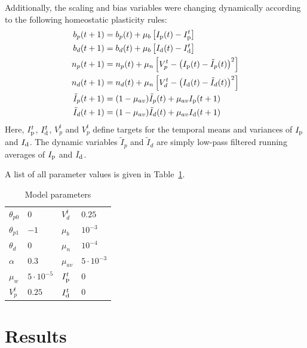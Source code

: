 \documentclass[10pt,a4paper,twocolumn]{article}
\begin{document}
		Additionally, the scaling and bias variables were changing dynamically
		according to the following homeostatic plasticity rules:
		\begin{align}
			b_p(t+1) &= b_p(t) + \mu_b \left[I_{\rm p}(t) - I_{\rm p}^t\right] \\
			b_d(t+1) &= b_d(t) + \mu_b \left[I_{\rm d}(t) - I_{\rm d}^t\right] \\
			n_p(t+1) &= n_p(t) + \mu_n \left[V_p^t - \left( I_{\rm p}(t) - \tilde{I}_p(t)\right)^2\right] \\
			n_d(t+1) &= n_d(t) + \mu_n \left[V_d^t - \left( I_{\rm d}(t) - \tilde{I}_d(t)\right)^2\right] \\
			\tilde{I}_p(t+1) &= (1-\mu_{av})\tilde{I}_p(t) + \mu_{av} I_{\rm p}(t+1) \\
			\tilde{I}_d(t+1) &= (1-\mu_{av})\tilde{I}_d(t) + \mu_{av} I_{\rm d}(t+1)
		\end{align}
		Here, $I_{\rm p}^t$, $I_{\rm d}^t$, $V_p^t$ and $V_p^t$ define targets for the 
		temporal means and variances of $I_{\rm p}$ and $I_{\rm d}$. The dynamic variables 
		$\tilde{I}_p$ and $\tilde{I}_d$ are simply low-pass filtered running 
		averages of $I_{\rm p}$ and $I_{\rm d}$.
		
		A list of all parameter values is given in Table~\ref{tab:parameters}.
		
		\begin{table}
			\begin{tabular}{ l | l || l | l }
				$\theta_{p0}$ & $0$ & $V_d^t$ & $0.25$ \\
				$\theta_{p1}$ & $-1$ & $\mu_b$ & $10^{-3}$ \\ 
				$\theta_{d}$ & $0$ & $\mu_n$ & $10^{-4}$ \\  
				$\alpha$ & $0.3$ & $\mu_{av}$ & $5 \cdot 10^{-3}$ \\   
				$\mu_w$ & $5 \cdot 10^{-5}$ & $I_{\rm p}^t$ & $0$ \\
				$V_p^t$ & $0.25$ & $I_{\rm d}^t$ & $0$  
			\end{tabular}
		\caption{Model parameters}
		\label{tab:parameters}
		\end{table}
		
		\section{Results}
		\label{sect:results}
		
\end{document}

